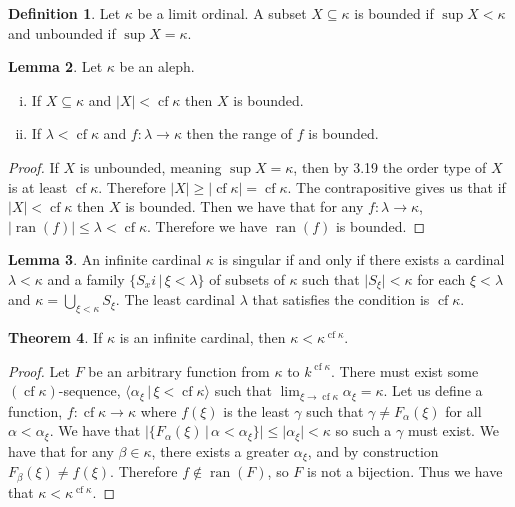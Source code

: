 \documentclass{article}
\theoremstyle{definition}
\newtheorem{thm}{Theorem}[section]
\newtheorem{defn}[thm]{Definition}
\newtheorem{lmma}[thm]{Lemma}
\DeclareMathOperator{\ran}{ran}
\DeclareMathOperator{\cf}{cf}
\newcommand{\abs}[1]{\lvert#1\rvert}
\begin{document}
\begin{defn}
    Let $\kappa$ be a limit ordinal. A subset $X \subseteq \kappa$ is bounded if $\sup X < \kappa$ and unbounded if $\sup X = \kappa$.
\end{defn}

\begin{lmma}
    Let $\kappa$ be an aleph.
    \begin{enumerate}[(i)]
        \item If $X \subseteq \kappa$ and $\abs{X} < \cf \kappa$ then $X$ is bounded.
        \item If $\lambda < \cf \kappa$ and $f: \lambda \to \kappa$ then the range of $f$ is bounded.
    \end{enumerate}
\end{lmma}

\begin{proof}
    If $X$ is unbounded, meaning $\sup X = \kappa$, then by 3.19 the order type of $X$ is at least $\cf \kappa$. Therefore $\abs{X} \ge \abs{\cf \kappa} = \cf \kappa$. The contrapositive gives us that if $\abs{X} < \cf \kappa$ then $X$ is bounded. Then we have that for any $f: \lambda \to \kappa$, $\abs{\ran(f)} \le \lambda < \cf \kappa$. Therefore we have $\ran(f)$ is bounded. 
\end{proof}

\begin{lmma}
    An infinite cardinal $\kappa$ is singular if and only if there exists a cardinal $\lambda < \kappa$ and a family $\{S_xi \, | \, \xi < \lambda\}$ of subsets of $\kappa$ such that $\abs{S_\xi} < \kappa$ for each $\xi < \lambda$ and $\kappa = \bigcup_{\xi < \kappa} S_\xi$. The least cardinal $\lambda$ that satisfies the condition is $\cf \kappa$.
\end{lmma}

\newpage

\begin{thm}
    If $\kappa$ is an infinite cardinal, then $\kappa < \kappa^{\cf \kappa}$.
\end{thm}

\begin{proof}
    Let $F$ be an arbitrary function from $\kappa$ to $k^{\cf \kappa}$. There must exist some $(\cf \kappa)$-sequence, $\langle \alpha_\xi \, | \, \xi < \cf \kappa \rangle$ such that $\lim_{\xi \to \cf \kappa} \alpha_\xi = \kappa$. Let us define a function, $f: \cf \kappa \to \kappa$ where $f(\xi)$ is the least $\gamma$ such that $\gamma \ne F_\alpha(\xi)$ for all $\alpha < \alpha_\xi$. We have that $\abs{\{F_\alpha(\xi) \, | \, \alpha < \alpha_\xi\}} \le \abs{\alpha_\xi} < \kappa$ so such a $\gamma$ must exist. We have that for any $\beta \in \kappa$, there exists a greater $\alpha_\xi$, and by construction $F_\beta(\xi) \ne f(\xi)$. Therefore $f \not\in \ran(F)$, so $F$ is not a bijection. Thus we have that $\kappa < \kappa^{\cf \kappa}$.
\end{proof}
\end{document}
